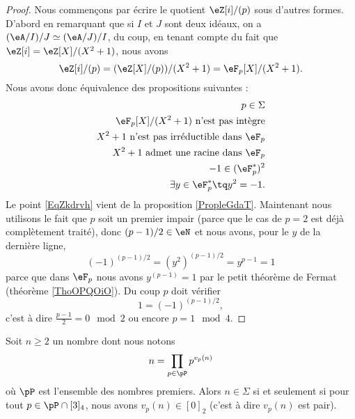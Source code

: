 \begin{proof}
    Nous commençons par écrire le quotient \( \eZ[i]/(p)\) sous d'autres formes. D'abord en remarquant que si \( I\) et \( J\) sont deux idéaux, on a \( (\eA/I)/J\simeq (\eA/J)/I\), du coup, en tenant compte du fait que \( \eZ[i]=\eZ[X]/(X^2+1)\), nous avons
    \begin{equation}
        \eZ[i]/(p)=(\eZ[X]/(p))/(X^2+1)=\eF_p[X]/(X^2+1).
    \end{equation}
    Nous avons donc équivalence des propositions suivantes :
    \begin{subequations}
        \begin{align}
            p\in\Sigma\\
            \eF_p[X]/(X^2+1)\text{ n'est pas intègre}\\
            X^2+1\text{ n'est pas irréductible dans \( \eF_p\)} \label{EqZkdrvh}\\
            \text{\( X^2+1\) admet une racine dans \( \eF_p\)}\\
            -1\in (\eF_p^*)^2\\
            \exists y\in \eF_p^*\tq y^2=-1.
        \end{align}
    \end{subequations}
    Le point \eqref{EqZkdrvh} vient de la proposition \ref{PropleGdaT}. Maintenant nous utilisons le fait que \( p\) soit un premier impair (parce que le cas de \( p=2\) est déjà complètement traité), donc \( (p-1)/2\in \eN\) et nous avons, pour le \( y\) de la dernière ligne,
    \begin{equation}
        (-1)^{(p-1)/2}=(y^2)^{(p-1)/2}=y^{p-1}=1
    \end{equation}
    parce que dans \( \eF_p\) nous avons \( y^{(p-1)}=1\) par le petit théorème de Fermat (théorème \ref{ThoOPQOiO}). Du coup \( p\) doit vérifier
    \begin{equation}
        1=(-1)^{(p-1)/2},
    \end{equation}
    c'est à dire \( \frac{ p-1 }{2}=0\mod 2\) ou encore \( p=1\mod 4\).
\end{proof}

\begin{theorem}
    Soit \( n\geq 2\) un nombre dont nous notons
    \begin{equation}    \label{EqBMHTzCT}
        n=\prod_{p\in\pP}p^{v_p(n)}
    \end{equation}
    où \( \pP\) est l'ensemble des nombres premiers. Alors \( n\in \Sigma\) si et seulement si pour tout \( p\in\pP\cap[3]_4\), nous avons \( v_p(n)\in [0]_2\) (c'est à dire \( v_p(n)\) est pair).
\end{theorem}

